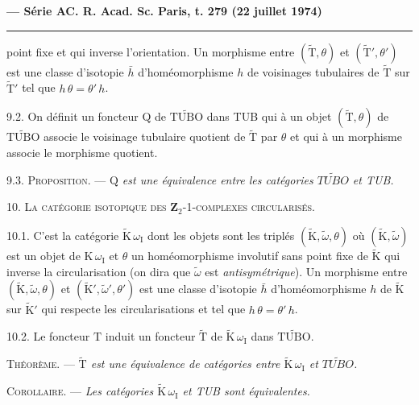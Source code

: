 \textbf{--- Série A}\hfill\textbf{C. R. Acad. Sc. Paris, t. 279 (22 juillet 1974)}\par\noindent\rule{\linewidth}{.35pt}\par

point fixe et qui inverse l'orientation. Un morphisme entre \((\widetilde{\mathrm{T}},\theta)\) et \((\widetilde{\mathrm{T}}',\theta')\) est une classe d'isotopie \(\bar h\) d'homéomorphisme \(h\) de voisinages tubulaires de \(\widetilde{\mathrm{T}}\) sur \(\widetilde{\mathrm{T}}'\) tel que \(h\,\theta=\theta'\,h\).

9.2. On définit un foncteur \(\mathrm{Q}\) de \(\widetilde{\mathrm{TUBO}}\) dans TUB qui à un objet \((\widetilde{\mathrm{T}},\theta)\) de \(\widetilde{\mathrm{TUBO}}\) associe le voisinage tubulaire quotient de \(\widetilde{\mathrm{T}}\) par \(\theta\) et qui à un morphisme associe le morphisme quotient.

9.3. \textsc{Proposition.} --- \textit{\(\mathrm{Q}\) est une équivalence entre les catégories \(\widetilde{\mathit{TUBO}}\) et TUB.}

10. \textsc{La catégorie isotopique des \(\mathbf{Z}_2\)-1-complexes circularisés.}

10.1. C'est la catégorie \(\widetilde{\mathrm{K}}\,\omega_{\mathrm{I}}\) dont les objets sont les triplés \((\widetilde{\mathrm{K}},\widetilde\omega,\theta)\) où \((\widetilde{\mathrm{K}},\widetilde\omega)\) est un objet de \(\mathrm{K}\,\omega_{\mathrm{I}}\) et \(\theta\) un homéomorphisme involutif sans point fixe de \(\widetilde{\mathrm{K}}\) qui inverse la circularisation (on dira que \(\widetilde\omega\) est \textit{antisymétrique}). Un morphisme entre \((\widetilde{\mathrm{K}},\widetilde\omega,\theta)\) et \((\widetilde{\mathrm{K}}',\widetilde\omega',\theta')\) est une classe d'isotopie \(\bar h\) d'homéomorphisme \(h\) de \(\widetilde{\mathrm{K}}\) sur \(\widetilde{\mathrm{K}}'\) qui respecte les circularisations et tel que \(h\,\theta=\theta'\,h\).

10.2. Le foncteur \(\mathrm{T}\) induit un foncteur \(\widetilde{\mathrm{T}}\) de \(\widetilde{\mathrm{K}}\,\omega_{\mathrm{I}}\) dans \(\widetilde{\mathrm{TUBO}}\).

\textsc{Théorème.} --- \textit{\(\widetilde{\mathrm{T}}\) est une équivalence de catégories entre \(\widetilde{\mathrm{K}}\,\omega_{\mathrm{I}}\) et \(\widetilde{\mathit{TUBO}}\).}

\textsc{Corollaire.} --- \textit{Les catégories \(\widetilde{\mathrm{K}}\,\omega_{\mathrm{I}}\) et TUB sont équivalentes.}

